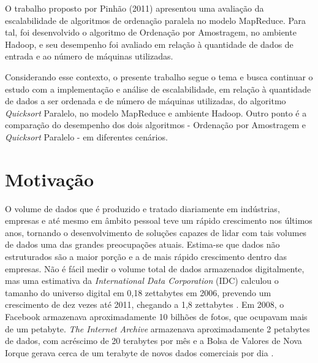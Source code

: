 O trabalho proposto por %
Pinhão (2011) apresentou uma avaliação da escalabilidade 
de algoritmos de ordenação paralela no modelo MapReduce. Para tal, foi desenvolvido o algoritmo de Ordenação por Amostragem, no ambiente Hadoop, e seu desempenho foi avaliado em relação à quantidade de dados de entrada e ao número de máquinas utilizadas. 

Considerando esse contexto, o presente trabalho segue o tema e busca continuar o estudo com a implementação e análise de escalabilidade, em relação à quantidade de dados a ser ordenada e de número de máquinas utilizadas, do algoritmo \textit{Quicksort} Paralelo, no modelo MapReduce e ambiente Hadoop. Outro ponto é a comparação do desempenho dos dois algoritmos - Ordenação por Amostragem e \textit{Quicksort} Paralelo - em diferentes cenários.


\section{Motivação}
\label{sec:motivacao}



O volume de dados que é produzido e tratado diariamente em indústrias, empresas e até mesmo em âmbito pessoal teve um rápido crescimento nos últimos anos, tornando o desenvolvimento de soluções capazes de lidar com tais volumes de dados uma das grandes preocupações atuais. Estima-se que dados não estruturados são a maior porção e a de mais rápido crescimento dentro das empresas. 
Não é fácil medir o volume total de dados armazenados digitalmente, mas uma estimativa da \textit{International Data Corporation} (IDC) calculou o tamanho do universo digital em 0,18 zettabytes em 2006, prevendo um crescimento de dez vezes até 2011, chegando a 1,8 zettabytes \cite{Gantz:2008}.
Em 2008, o Facebook armazenava aproximadamente 10 bilhões de fotos, que ocupavam mais de um petabyte. \textit{The Internet Archive} armazenava aproximadamente 2 petabytes de dados, com acréscimo de 20 terabytes por mês e a Bolsa de Valores de Nova Iorque gerava cerca de um terabyte de novos dados comerciais por dia
\cite{White:2009}. %


